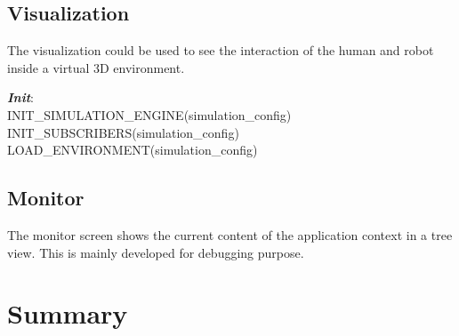 \subsection*{Visualization} The visualization could be used to see the interaction of the human and robot inside a virtual 3D environment.
\begin{algorithm}
 \textbf{\emph{Init}}:\\
 \quad INIT\_SIMULATION\_ENGINE(simulation\_config) \;
 \quad INIT\_SUBSCRIBERS(simulation\_config) \;
 \quad LOAD\_ENVIRONMENT(simulation\_config) \; 
\end{algorithm}

\subsection*{Monitor}
The monitor screen shows the current content of the application context in a tree view. This is mainly developed for debugging purpose.

\section{Summary}
